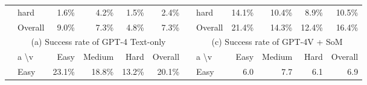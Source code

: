 \begin{figure}[ht]
{\begin{tabular}{@{}clrrrrrlrrrr@{}}
\multicolumn{1}{|c|}{}                                         & \cellcolor[HTML]{D9D9D9}hard               & \cellcolor[HTML]{FFFFFF}1.6\%                    & \cellcolor[HTML]{E6F5ED}4.2\%                      & \cellcolor[HTML]{FFFFFF}1.5\%                    & \cellcolor[HTML]{F7FCFA}2.4\%                       &  & \cellcolor[HTML]{D9D9D9}hard               & \cellcolor[HTML]{D6EFE3}14.1\%                   & \cellcolor[HTML]{F3FBF7}10.4\%                     & \cellcolor[HTML]{FFFFFF}8.9\%                    & \cellcolor[HTML]{F3FAF7}10.5\%                      \\
\multicolumn{1}{|c|}{}                                         & \cellcolor[HTML]{D9D9D9}Overall            & \cellcolor[HTML]{B7E2CD}9.0\%                    & \cellcolor[HTML]{C7E9D8}7.3\%                      & \cellcolor[HTML]{DFF3E9}4.8\%                    & \cellcolor[HTML]{C8E9D9}7.3\%                       &  & \cellcolor[HTML]{D9D9D9}Overall            & \cellcolor[HTML]{9CD7BA}21.4\%                   & \cellcolor[HTML]{D4EEE1}14.3\%                     & \cellcolor[HTML]{E4F4EC}12.4\%                   & \cellcolor[HTML]{C4E7D6}16.4\%                      \\
\multicolumn{1}{|c|}{}                                            & \multicolumn{5}{c}{(a) Success rate of GPT-4 Text-only}                                                                                                                         &  & \multicolumn{5}{c}{(c) Success rate of GPT-4V + SoM}                                                                                                                            \\
\multicolumn{1}{|c|}{}                                            & \cellcolor[HTML]{D9D9D9}a \textbackslash v & \cellcolor[HTML]{D9D9D9}Easy   & \cellcolor[HTML]{D9D9D9}Medium & \cellcolor[HTML]{D9D9D9}Hard   & \cellcolor[HTML]{D9D9D9}Overall &  & \cellcolor[HTML]{D9D9D9}a \textbackslash v & \cellcolor[HTML]{D9D9D9}Easy   & \cellcolor[HTML]{D9D9D9}Medium & \cellcolor[HTML]{D9D9D9}Hard   & \cellcolor[HTML]{D9D9D9}Overall \\
\multicolumn{1}{|c|}{}                                         & \cellcolor[HTML]{D9D9D9}Easy               & \cellcolor[HTML]{57BB8A}23.1\%                   & \cellcolor[HTML]{80CCA6}18.8\%                     & \cellcolor[HTML]{B5E1CB}13.2\%                   & \cellcolor[HTML]{73C79E}20.1\%                      &  & \cellcolor[HTML]{D9D9D9}Easy               & 6.0                      & 7.7                        & 6.1                      & 6.9                         \\

\end{tabular}}
\end{figure}
